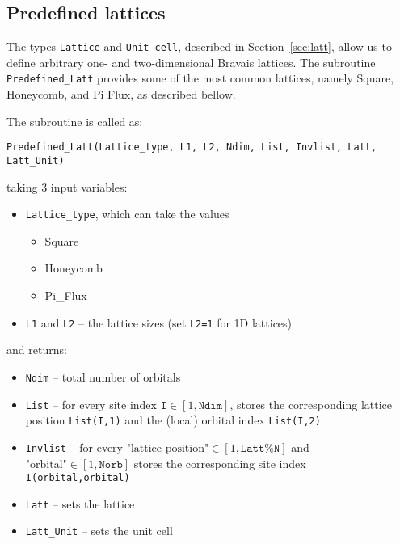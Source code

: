 %
\subsection{Predefined lattices} \label{sec:predefined_lattices}

The types \texttt{Lattice} and \texttt{Unit\_cell}, described in Section~\ref{sec:latt}, allow us to define arbitrary one- and two-dimensional Bravais lattices. The subroutine \texttt{Predefined\_Latt} provides some of the most common lattices, namely Square, Honeycomb, and Pi Flux, as described bellow.

The subroutine is called as:
\begin{lstlisting}[style=fortran]
Predefined_Latt(Lattice_type, L1, L2, Ndim, List, Invlist, Latt, Latt_Unit)
\end{lstlisting}
taking 3 input variables:
\begin{itemize}
	\item \texttt{Lattice\_type}, which can take the values
	\begin{itemize}
		\item Square
		\item Honeycomb
		\item Pi\_Flux
	\end{itemize}
	\item \texttt{L1} and \texttt{L2} -- the lattice sizes (set \texttt{L2=1} for 1D lattices)
\end{itemize}
and returns:
\begin{itemize}
	\item \texttt{Ndim} -- total number of orbitals
	\item \texttt{List} -- for every site index $\texttt{I} \in [1,\texttt{Ndim}]$, stores the corresponding lattice position \texttt{List(I,1)} and the (local) orbital index \texttt{List(I,2)}
	\item \texttt{Invlist} -- for every $\textrm{"lattice position"} \in [1,\texttt{Latt\%N}]$ and $\textrm{"orbital"} \in [1,\texttt{Norb}]$ stores the corresponding site index \texttt{I(\textrm{orbital},\textrm{orbital})}
	\item \texttt{Latt} -- sets the lattice
	\item \texttt{Latt\_Unit} -- sets the unit cell
\end{itemize}
